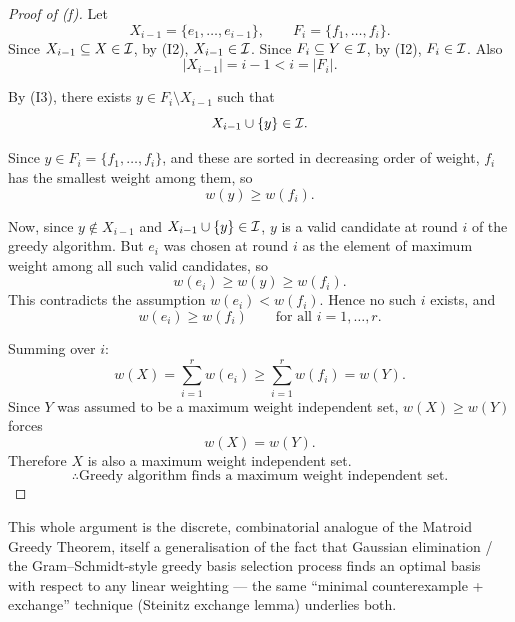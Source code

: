 \begin{solbox}[long]
\begin{solution}[(f)]
\begin{proof}[Proof of (f)]
    Let
    \[
        X_{i-1}=\{e_1,\dots,e_{i-1}\}, \qquad F_i=\{f_1,\dots,f_i\}.
    \]
    Since $X_{i-1}\subseteq X\in\mathcal{I}$, by (I2), $X_{i-1}\in\mathcal{I}$. Since
    $F_i\subseteq Y\in\mathcal{I}$, by (I2), $F_i\in\mathcal{I}$. Also
    \[
        |X_{i-1}|=i-1 < i = |F_i|.
    \]

    By (I3), there exists $y\in F_i\setminus X_{i-1}$ such that
    \[
        X_{i-1}\cup\{y\}\in\mathcal{I}.
    \]

    Since $y\in F_i = \{f_1,\dots,f_i\}$, and these are sorted in
    decreasing order of weight, $f_i$ has the smallest weight among
    them, so
    \[
        w(y) \ge w(f_i).
    \]

    Now, since $y\notin X_{i-1}$ and $X_{i-1}\cup\{y\}\in\mathcal{I}$, $y$ is a
    valid candidate at round $i$ of the greedy algorithm. But $e_i$
    was chosen at round $i$ as the element of maximum weight among
    all such valid candidates, so
    \[
        w(e_i) \ge w(y) \ge w(f_i).
    \]
    This contradicts the assumption $w(e_i) < w(f_i)$. Hence no such
    $i$ exists, and
    \[
        w(e_i)\ge w(f_i) \qquad \text{for all } i=1,\dots,r.
    \]

    \medskip
    Summing over $i$:
    \[
        w(X) = \sum_{i=1}^r w(e_i) \ge \sum_{i=1}^r w(f_i) = w(Y).
    \]
    Since $Y$ was assumed to be a maximum weight independent set,
    $w(X)\ge w(Y)$ forces
    \[
        w(X)=w(Y).
    \]
    Therefore $X$ is also a maximum weight independent set.
    \[
        \therefore \text{Greedy algorithm finds a maximum weight
        independent set.}
    \]
\end{proof}

\begin{remark}
    This whole argument is the discrete, combinatorial analogue of
    the Matroid Greedy Theorem, itself a generalisation of the fact
    that Gaussian elimination / the Gram--Schmidt-style greedy basis
    selection process finds an optimal basis with respect to any
    linear weighting --- the same ``minimal counterexample +
    exchange'' technique (Steinitz exchange lemma) underlies both.
\end{remark}
\end{solution}

\FloatBarrier
\end{solbox}

